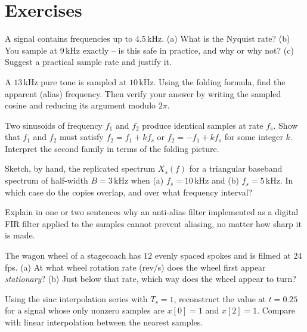 \section{Exercises}
\label{ch18:exercises}

\begin{exercise}
A signal contains frequencies up to $4.5$\,kHz. (a) What is the Nyquist rate? (b) You
sample at $9$\,kHz exactly -- is this safe in practice, and why or why not? (c) Suggest
a practical sample rate and justify it.
\end{exercise}

\begin{exercise}
A $13$\,kHz pure tone is sampled at $10$\,kHz. Using the folding formula, find the
apparent (alias) frequency. Then verify your answer by writing the sampled cosine and
reducing its argument modulo $2\pi$.
\end{exercise}

\begin{exercise}
Two sinusoids of frequency $f_1$ and $f_2$ produce identical samples at rate $f_s$.
Show that $f_1$ and $f_2$ must satisfy $f_2 = f_1 + k f_s$ or $f_2 = -f_1 + k f_s$ for
some integer $k$. Interpret the second family in terms of the folding picture.
\end{exercise}

\begin{exercise}
Sketch, by hand, the replicated spectrum $X_s(f)$ for a triangular baseband spectrum of
half-width $B = 3$\,kHz when (a) $f_s = 10$\,kHz and (b) $f_s = 5$\,kHz. In which case do
the copies overlap, and over what frequency interval?
\end{exercise}

\begin{exercise}
Explain in one or two sentences why an anti-alias filter implemented as a digital FIR
filter applied to the samples cannot prevent aliasing, no matter how sharp it is made.
\end{exercise}

\begin{exercise}
The wagon wheel of a stagecoach has $12$ evenly spaced spokes and is filmed at
$24$\,fps. (a) At what wheel rotation rate (rev/s) does the wheel first appear
\emph{stationary}? (b) Just below that rate, which way does the wheel appear to turn?
\end{exercise}

\begin{exercise}
Using the sinc interpolation series with $T_s=1$, reconstruct the value at $t = 0.25$
for a signal whose only nonzero samples are $x[0]=1$ and $x[2]=1$. Compare with linear
interpolation between the nearest samples.
\end{exercise}

